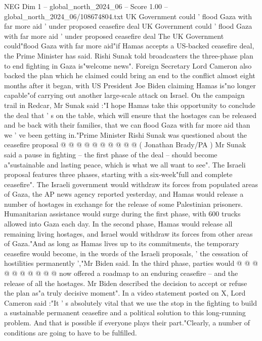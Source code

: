\begin{textsample}{NEG Dim 1 – global\_north\_2024\_06 – Score 1.00 – global\_north\_2024\_06/108674804.txt}  \label{ex:f1_neg_144}
UK Government could ' flood Gaza with far more aid ' under proposed ceasefire deal UK Government could ' flood Gaza with far more aid ' under proposed ceasefire deal The UK Government could"flood Gaza with far more aid"if Hamas accepts a US-backed ceasefire deal, the Prime Minister has said.
Rishi Sunak told broadcasters the three-phase plan to end fighting in Gaza is"welcome news".
Foreign Secretary Lord Cameron also backed the plan which he claimed could bring an end to the conflict almost eight months after it began, with US President Joe Biden claiming Hamas is"no longer capable"of carrying out another large-scale attack on Israel.
On the campaign trail in Redcar, Mr Sunak said :"I hope Hamas take this opportunity to conclude the deal that ' s on the table, which will ensure that the hostages can be released and be back with their families, that we can flood Gaza with far more aid than we ' ve been getting in."Prime Minister Rishi Sunak was questioned about the ceasefire proposal @ @ @ @ @ @ @ @ @ @ ( Jonathan Brady/PA ) Mr Sunak said a pause in fighting -- the first phase of the deal -- should become a"sustainable and lasting peace, which is what we all want to see".
The Israeli proposal features three phases, starting with a six-week"full and complete ceasefire".
The Israeli government would withdraw its forces from populated areas of Gaza, the AP news agency reported yesterday, and Hamas would release a number of hostages in exchange for the release of some Palestinian prisoners.
Humanitarian assistance would surge during the first phase, with 600 trucks allowed into Gaza each day.
In the second phase, Hamas would release all remaining living hostages, and Israel would withdraw its forces from other areas of Gaza."And as long as Hamas lives up to its commitments, the temporary ceasefire would become, in the words of the Israeli proposals, ' the cessation of hostilities permanently ',"Mr Biden said.
In the third phase, parties would @ @ @ @ @ @ @ @ @ @ now offered a roadmap to an enduring ceasefire -- and the release of all the hostages.
Mr Biden described the decision to accept or refuse the plan as"a truly decisive moment".
In a video statement posted on X, Lord Cameron said :"It ' s absolutely vital that we use the stop in the fighting to build a sustainable permanent ceasefire and a political solution to this long-running problem.
And that is possible if everyone plays their part."Clearly, a number of conditions are going to have to be fulfilled.

\end{textsample}
